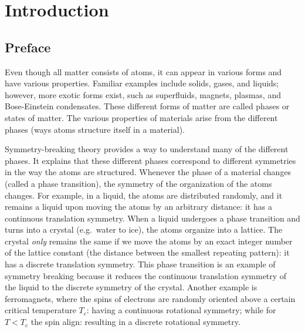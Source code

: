 \chapter{Introduction}
\label{ch:introduction}

\section{Preface}

Even though all matter consists of atoms, it can appear in various forms and have various properties.
Familiar examples include solids, gases, and liquids; however, more exotic forms exist, such as superfluids, magnets, plasmas, and Bose-Einstein condensates.
These different forms of matter are called phases or states of matter.
The various properties of materials arise from the different phases (ways atoms structure itself in a material).

Symmetry-breaking theory provides a way to understand many of the different phases.
It explains that these different phases correspond to different symmetries in the way the atoms are structured.
Whenever the phase of a material changes (called a phase transition), the symmetry of the organization of the atoms changes.
For example, in a liquid, the atoms are distributed randomly, and it remains a liquid upon moving the atoms by an arbitrary distance: it has a continuous translation symmetry.
When a liquid undergoes a phase transition and turns into a crystal (e.g.~water to ice), the atoms organize into a lattice.
The crystal \textit{only} remains the same if we move the atoms by an exact integer number of the lattice constant (the distance between the smallest repeating pattern): it has a discrete translation symmetry.
This phase transition is an example of symmetry breaking because it reduces the continuous translation symmetry of the liquid to the discrete symmetry of the crystal.
Another example is ferromagnets, where the spins of electrons are randomly oriented above a certain critical temperature $T_c$: having a continuous rotational symmetry; while for $T<T_c$ the spin align: resulting in a discrete rotational symmetry.

